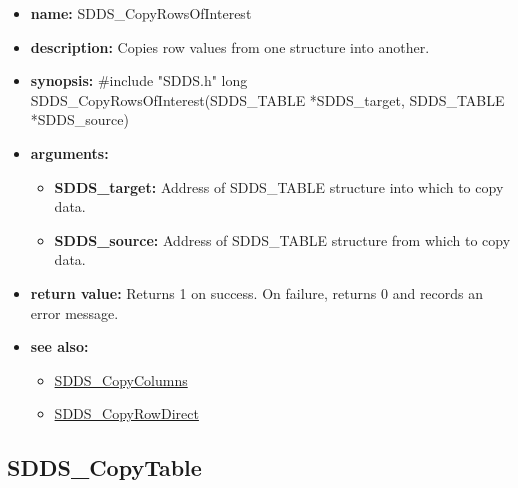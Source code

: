 \documentclass[11pt]{article}
\newcommand{\progref}[1]{\hyperref{SDDS_#1}{{\tt SDDS\_#1} (}{)}{SDDS_#1}}
\begin{document}
\begin{itemize}
\item {\bf name:}\newline
SDDS\_CopyRowsOfInterest
\item {\bf description:}\newline
Copies row values from one structure into another.
\item {\bf synopsis:} \#include "SDDS.h"\newline
long SDDS\_CopyRowsOfInterest(SDDS\_TABLE *SDDS\_target, SDDS\_TABLE *SDDS\_source)
\item {\bf arguments:}
\begin{itemize}
\item {\bf SDDS\_target:} Address of SDDS\_TABLE structure into which to copy data.
\item {\bf SDDS\_source:} Address of SDDS\_TABLE structure from which to copy data.
\end{itemize}
\item {\bf return value:}\newline
Returns 1 on success. On failure, returns 0 and records an error message.
\item {\bf see also:}
\begin{itemize}
\item \progref{CopyColumns}
\item \progref{CopyRowDirect}
\end{itemize}
\end{itemize}

\subsection{SDDS\_CopyTable}
\label{SDDS_CopyTable}
\end{document}
